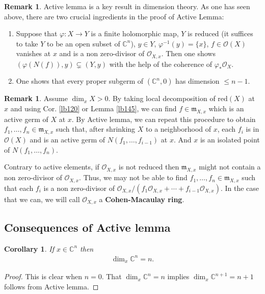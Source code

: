 \documentclass[12pt,b5paper,notitlepage]{report}
\theoremstyle{definition}
\newtheorem{rem}[df]{Remark}
\theoremstyle{plain}
\newtheorem{co}[df]{Corollary}
\newcommand{\fk}{\mathfrak}
\newcommand{\scr}{\mathscr}
\newcommand{\Cbb}{\mathbb C}
\newcommand{\red}{\mathrm{red}}
\numberwithin{equation}{section}
\begin{document}
\begin{rem}
Active lemma is a key result in dimension theory. As one has seen above, there are two crucial ingredients in the proof of Active Lemma: 
\begin{enumerate}[label=(\arabic*)]
\item Suppose that $\varphi:X\rightarrow Y$ is a finite holomorphic map, $Y$ is reduced (it suffices to take $Y$ to be an open subset of $\Cbb^n$), $y\in Y$, $\varphi^{-1}(y)=\{x\}$, $f\in\scr O(X)$ vanishes at $x$ and is a non zero-divisor of $\scr O_{X,x}$. Then one shows  $(\varphi(N(f)),y)\subsetneq (Y,y)$ with the help of the coherence of $\varphi_*\scr O_X$.
\item One shows that every proper subgerm of $(\Cbb^n,0)$ has dimension $\leq n-1$. 
\end{enumerate}
\end{rem}





\begin{rem}\label{lb148}
Assume $\dim_xX>0$. By taking local decomposition of $\red(X)$ at $x$ and using Cor. \ref{lb120} or Lemma \ref{lb145}, we can find $f\in\fk m_{X,x}$ which is an active germ of $X$ at $x$. By Active lemma, we can repeat this procedure to obtain $f_1,\dots,f_n\in\fk m_{X,x}$ such that, after shrinking $X$ to a neighborhood of $x$, each $f_i$ is in $\scr O(X)$ and is an active germ of $N(f_1,\dots,f_{i-1})$ at $x$. And $x$ is an isolated point of $N(f_1,\dots,f_n)$.

Contrary to active elements, if $\scr O_{X,x}$ is not reduced then $\fk m_{X,x}$ might not contain a non zero-divisor of $\scr O_{X,x}$. Thus, we may not be able to find $f_1,\dots,f_n\in\fk m_{X,x}$ such that each $f_i$ is a non zero-divisor of $\scr O_{X,x}/(f_1\scr O_{X,x}+\cdots+f_{i-1}\scr O_{X,x})$. In the case that we can, we will call $\scr O_{X,x}$ a \textbf{Cohen-Macaulay ring}. 
\end{rem}







\subsection{Consequences of Active lemma}







\begin{co}
If $x\in\Cbb^n$ then
\begin{align*}
\dim_x\Cbb^n=n.
\end{align*}
\end{co}
\begin{proof}
This is clear when $n=0$. That $\dim_x\Cbb^n=n$ implies $\dim_x\Cbb^{n+1}=n+1$ follows from Active lemma.
\end{proof}
\end{document}
